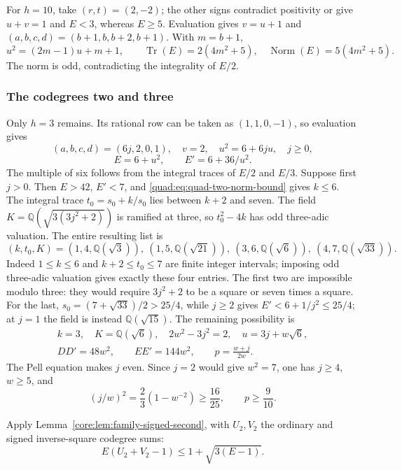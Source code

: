 \documentclass[11pt,a4paper]{article}
\theoremstyle{definition}\newtheorem{definition}[theorem]{Definition}
\theoremstyle{remark}\newtheorem{remark}[theorem]{Remark}
\newcommand{\Q}{\mathbb Q}
\numberwithin{equation}{section}
\begin{document}
For $h=10$, take $(r,t)=(2,-2)$; the other signs contradict
positivity or give $u+v=1$ and $E<3$, whereas $E\ge5$.
Evaluation gives $v=u+1$ and
$(a,b,c,d)=(b+1,b,b+2,b+1)$. With $m=b+1$,
\[
 u^2=(2m-1)u+m+1,\qquad
 \operatorname{Tr}(E)=2(4m^2+5),\quad
 \operatorname{Norm}(E)=5(4m^2+5).
\]
The norm is odd, contradicting the integrality of $E/2$.

\subsubsection{The codegrees two and three}

Only $h=3$ remains. Its rational row can be taken as $(1,1,0,-1)$,
so evaluation gives
\[
 (a,b,c,d)=(6j,2,0,1),\quad
 v=2,\quad u^2=6+6ju,\quad j\ge0,
\]
\[
 E=6+u^2,\qquad E'=6+36/u^2.
\]
The multiple of six follows from the integral traces of $E/2$ and
$E/3$.
Suppose first $j>0$. Then $E>42$, $E'<7$, and
\eqref{quad:eq:quad-two-norm-bound} gives $k\le6$.
The integral trace $t_0=s_0+k/s_0$ lies between $k+2$ and seven.
The field $K=\Q(\sqrt{3(3j^2+2)})$ is ramified at three,
so $t_0^2-4k$ has odd three-adic valuation.
The entire resulting list is
\[
 (k,t_0,K)=(1,4,\Q(\sqrt3)),\
 (1,5,\Q(\sqrt{21})),\
 (3,6,\Q(\sqrt6)),\
 (4,7,\Q(\sqrt{33})).
\]
Indeed $1\le k\le6$ and $k+2\le t_0\le7$ are finite integer
intervals; imposing odd three-adic valuation gives exactly these
four entries. The first two are impossible modulo three: they
would require $3j^2+2$ to be a square or seven times a square.
For the last, $s_0=(7+\sqrt{33})/2>25/4$, while $j\ge2$ gives
$E'<6+1/j^2\le25/4$; at $j=1$ the field is instead
$\Q(\sqrt{15})$.
The remaining possibility is
\begin{equation}\label{quad:eq:quad-two-pell}
 \begin{gathered}
 k=3,\quad K=\Q(\sqrt6),\quad
 2w^2-3j^2=2,\quad u=3j+w\sqrt6,\\
 DD'=48w^2,\qquad EE'=144w^2,\qquad
 p=\frac{w+j}{2w}.
 \end{gathered}
\end{equation}
The Pell equation makes $j$ even. Since $j=2$ would give $w^2=7$,
one has $j\ge4$, $w\ge5$, and
\[
 (j/w)^2=\frac23(1-w^{-2})\ge\frac{16}{25},\qquad p\ge\frac9{10}.
\]

Apply Lemma~\ref{core:lem:family-signed-second}, with $U_2,V_2$
the ordinary and signed inverse-square codegree sums:
\begin{equation}\label{quad:eq:quad-two-second-moment}
 E(U_2+V_2-1)\le1+\sqrt{3(E-1)}.
\end{equation}
\end{document}
